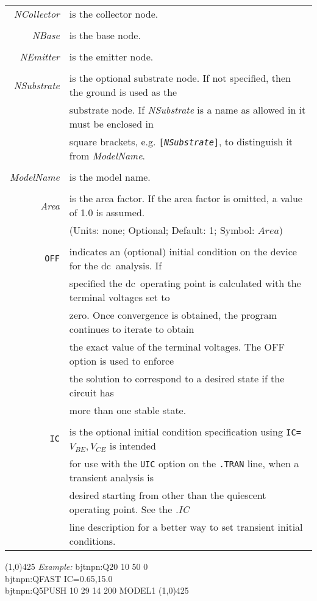 \documentclass{article}
\begin{document}
\begin{tabular}{r l}
{\it NCollector} & is the collector node. \\
& \\
{\it NBase} & is the base node. \\
& \\
{\it NEmitter} & is the emitter node. \\
& \\
{\it NSubstrate} & is the optional substrate node. If not specified, then the ground is used as the \\
& substrate node. If {\it NSubstrate} is a name as allowed in it must be enclosed in \\
& square brackets, e.g. {\tt [{\it NSubstrate}]}, to distinguish it from {\it ModelName}. \\
& \\
{\it ModelName} & is  the  model  name. \\
& \\
{\it Area} & is  the  area  factor. If the area  factor  is  omitted,  a  value of 1.0 is assumed. \\
& (Units: none; Optional; Default: 1; Symbol: $Area$) \\
& \\
{\tt OFF} & indicates an (optional) initial condition on the device for the dc\ analysis. If \\
& specified the dc\ operating point is calculated with the terminal voltages set to \\
& zero. Once convergence is obtained, the program continues to iterate to obtain \\
& the exact value of the  terminal  voltages.  The OFF option is used to enforce \\
& the solution to  correspond to  a  desired state if the circuit has \\
& more than one stable state. \\
& \\
{\tt IC} & is the optional initial condition specification using  {\tt IC=}$V_{BE},V_{CE}$ is  intended \\
& for use with the {\tt UIC} option on the {\tt .TRAN} line, when a transient analysis is \\
& desired  starting  from  other than  the  quiescent  operating  point. See  the {\it .IC} \\
& line description for a better way to set transient initial conditions.
\end{tabular}
\newpage
\noindent\linethickness{0.5mm}\line(1,0){425}
\newline
\noindent\textit{Example:}
\newline
bjtnpn:Q20 10 50 0\\
bjtnpn:QFAST IC=0.65,15.0 \\
bjtnpn:Q5PUSH 10 29 14 200 MODEL1
\newline
\linethickness{0.5mm}\line(1,0){425}
\end{document}
